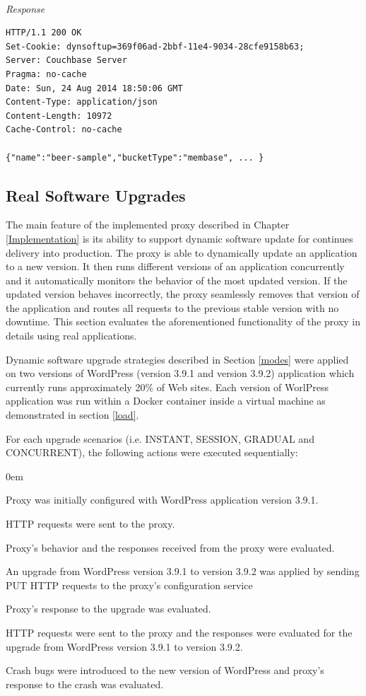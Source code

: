 \documentclass[a4paper,11pt,twoside]{report}
\begin{document}
\noindent\\
\textit{Response}
\begin{lstlisting}[language=terminal]
HTTP/1.1 200 OK
Set-Cookie: dynsoftup=369f06ad-2bbf-11e4-9034-28cfe9158b63;
Server: Couchbase Server
Pragma: no-cache
Date: Sun, 24 Aug 2014 18:50:06 GMT
Content-Type: application/json
Content-Length: 10972
Cache-Control: no-cache

{"name":"beer-sample","bucketType":"membase", ... }
\end{lstlisting}

\subsection{Real Software Upgrades}
The main feature of the implemented proxy described in Chapter \ref{Implementation} is its ability to support dynamic software update for continues delivery into production. The proxy is able to dynamically update an application to a new version. It then runs different versions of an application concurrently and it automatically monitors the behavior of the most updated version. If the updated version behaves incorrectly, the proxy seamlessly removes that version of the application and routes all requests to the previous stable version with no downtime. This section evaluates the aforementioned functionality of the proxy in details using real applications.

Dynamic software upgrade strategies described in Section \ref{modes} were applied on two versions of WordPress (version 3.9.1 and version 3.9.2) application which currently runs approximately 20\% of Web sites. Each version of WorlPress application was run within a Docker container inside a virtual machine as demonstrated in section \ref{load}.

For each upgrade scenarios (i.e. INSTANT, SESSION, GRADUAL and CONCURRENT), the following actions were executed sequentially:

\begin{list}{-}{}
  \itemsep0em
  \item Proxy was initially configured with WordPress application version 3.9.1. 
  \item HTTP requests were sent to the proxy.
  \item Proxy's behavior and the responses received from the proxy  were evaluated. 
  \item An upgrade from WordPress version 3.9.1 to version 3.9.2 was applied by sending PUT HTTP requests to the proxy's configuration service
  \item Proxy's response to the upgrade was evaluated.
  \item HTTP requests were sent to the proxy and the responses were evaluated for the upgrade from WordPress version 3.9.1 to version 3.9.2.
  \item Crash bugs were introduced to the new version of WordPress and proxy's response to the crash was evaluated.
\end{list} 
\end{document}
